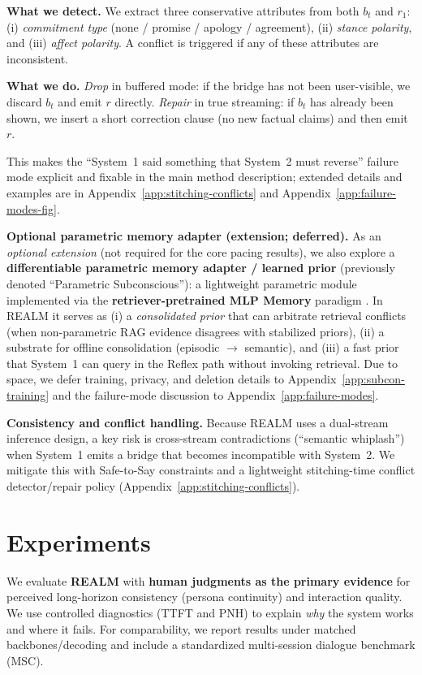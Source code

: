 \documentclass{article}
\begin{document}
\textbf{What we detect.} We extract three conservative attributes from both $b_t$ and $r_{1}$: (i) \emph{commitment type} (none / promise / apology / agreement), (ii) \emph{stance polarity}, and (iii) \emph{affect polarity}. A conflict is triggered if any of these attributes are inconsistent.

\textbf{What we do.}
\emph{Drop} in buffered mode: if the bridge has not been user-visible, we discard $b_t$ and emit $r$ directly.
\emph{Repair} in true streaming: if $b_t$ has already been shown, we insert a short correction clause (no new factual claims) and then emit $r$.

This makes the ``System~1 said something that System~2 must reverse'' failure mode explicit and fixable in the main method description; extended details and examples are in Appendix~\ref{app:stitching-conflicts} and Appendix~\ref{app:failure-modes-fig}.

\textbf{Optional parametric memory adapter (extension; deferred).}
As an \emph{optional extension} (not required for the core pacing results), we also explore a \textbf{differentiable parametric memory adapter / learned prior} (previously denoted ``Parametric Subconscious''): a lightweight parametric module implemented via the \textbf{retriever-pretrained MLP Memory} paradigm \cite{wei2025mlpmemory}.
In REALM it serves as (i) a \emph{consolidated prior} that can arbitrate retrieval conflicts (when non-parametric RAG evidence disagrees with stabilized priors), (ii) a substrate for offline consolidation (episodic $\rightarrow$ semantic), and (iii) a fast prior that System~1 can query in the Reflex path without invoking retrieval.
Due to space, we defer training, privacy, and deletion details to Appendix~\ref{app:subcon-training} and the failure-mode discussion to Appendix~\ref{app:failure-modes}.

\textbf{Consistency and conflict handling.}
Because REALM uses a dual-stream inference design, a key risk is cross-stream contradictions (``semantic whiplash'') when System~1 emits a bridge that becomes incompatible with System~2.
We mitigate this with Safe-to-Say constraints and a lightweight stitching-time conflict detector/repair policy (Appendix~\ref{app:stitching-conflicts}).

\section{Experiments}

We evaluate \textbf{REALM} with \textbf{human judgments as the primary evidence} for perceived long-horizon consistency (persona continuity) and interaction quality.
We use controlled diagnostics (TTFT and PNH) to explain \emph{why} the system works and where it fails.
For comparability, we report results under matched backbones/decoding and include a standardized multi-session dialogue benchmark (MSC).
\end{document}

